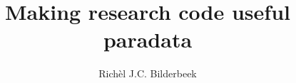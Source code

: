 \documentclass[graybox]{svmult}
\title{
Making research code useful paradata
}
\author{Richèl J.C. Bilderbeek}
\begin{document}
\maketitle

\iffalse
\tableofcontents
\fi



\end{document}
